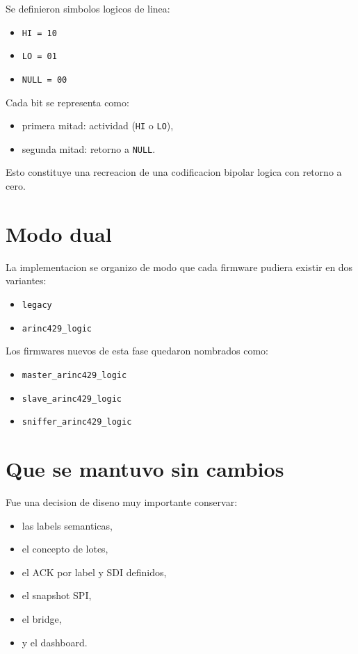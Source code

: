 \documentclass[12pt,a4paper,oneside]{report}
\begin{document}
Se definieron simbolos logicos de linea:

\begin{itemize}[leftmargin=1.2cm]
    \item \texttt{HI = 10}
    \item \texttt{LO = 01}
    \item \texttt{NULL = 00}
\end{itemize}

Cada bit se representa como:

\begin{itemize}[leftmargin=1.2cm]
    \item primera mitad: actividad (\texttt{HI} o \texttt{LO}),
    \item segunda mitad: retorno a \texttt{NULL}.
\end{itemize}

Esto constituye una recreacion de una codificacion bipolar logica con retorno a cero.

\section{Modo dual}

La implementacion se organizo de modo que cada firmware pudiera existir en dos variantes:

\begin{itemize}[leftmargin=1.2cm]
    \item \texttt{legacy}
    \item \texttt{arinc429\_logic}
\end{itemize}

Los firmwares nuevos de esta fase quedaron nombrados como:

\begin{itemize}[leftmargin=1.2cm]
    \item \texttt{master\_arinc429\_logic}
    \item \texttt{slave\_arinc429\_logic}
    \item \texttt{sniffer\_arinc429\_logic}
\end{itemize}

\section{Que se mantuvo sin cambios}

Fue una decision de diseno muy importante conservar:

\begin{itemize}[leftmargin=1.2cm]
    \item las labels semanticas,
    \item el concepto de lotes,
    \item el ACK por label y SDI definidos,
    \item el snapshot SPI,
    \item el bridge,
    \item y el dashboard.
\end{itemize}
\end{document}
